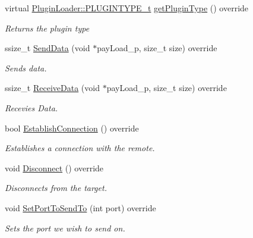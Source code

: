 \begin{DoxyCompactItemize}
virtual \mbox{\hyperlink{namespacePluginLoader_a7b1358e9577b47b5d4b16231a5a81699}{Plugin\+Loader\+::\+P\+L\+U\+G\+I\+N\+T\+Y\+P\+E\+\_\+t}} \mbox{\hyperlink{classlibNetworkCommunication_1_1libNetworkCommunication_a6851c7c48cde1af3d2b6e131fce6b8bc}{get\+Plugin\+Type}} () override
\begin{DoxyCompactList}\small\item\em Returns the plugin {\itshape type} \end{DoxyCompactList}\item 
ssize\+\_\+t \mbox{\hyperlink{classlibNetworkCommunication_1_1libNetworkCommunication_a250d34be8725b543412b792e375972ac}{Send\+Data}} (void $\ast$pay\+Load\+\_\+p, size\+\_\+t size) override
\begin{DoxyCompactList}\small\item\em Sends data. \end{DoxyCompactList}\item 
ssize\+\_\+t \mbox{\hyperlink{classlibNetworkCommunication_1_1libNetworkCommunication_adbe327ebbc37c81231c3f9843300c778}{Receive\+Data}} (void $\ast$pay\+Load\+\_\+p, size\+\_\+t size) override
\begin{DoxyCompactList}\small\item\em Recevies Data. \end{DoxyCompactList}\item 
bool \mbox{\hyperlink{classlibNetworkCommunication_1_1libNetworkCommunication_a93730e78b0aeef62fc45974a26ecc3c0}{Establish\+Connection}} () override
\begin{DoxyCompactList}\small\item\em Establishes a connection with the remote. \end{DoxyCompactList}\item 
void \mbox{\hyperlink{classlibNetworkCommunication_1_1libNetworkCommunication_ad32175486e47feee0a9e3b83877d66e9}{Disconnect}} () override
\begin{DoxyCompactList}\small\item\em Disconnects from the target. \end{DoxyCompactList}\item 
void \mbox{\hyperlink{classlibNetworkCommunication_1_1libNetworkCommunication_a9521f7bfbb8365956239846806e745b6}{Set\+Port\+To\+Send\+To}} (int port) override
\begin{DoxyCompactList}\small\item\em Sets the port we wish to send on. \end{DoxyCompactList}\item 

\end{DoxyCompactItemize}
